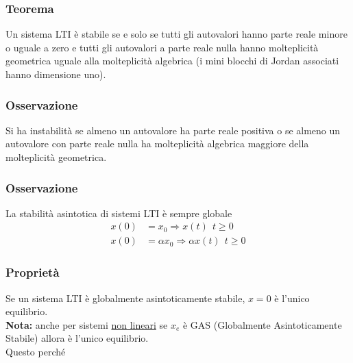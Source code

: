 \documentclass{article}
\numberwithin{equation}{subsection}
\begin{document}
\subsubsection*{Teorema}
Un sistema LTI è stabile se e solo se tutti gli autovalori hanno parte reale minore o uguale a zero e tutti gli autovalori a parte reale nulla hanno molteplicità geometrica uguale alla molteplicità algebrica (i mini blocchi di Jordan associati hanno dimensione uno).

\subsubsection*{Osservazione}
Si ha instabilità se almeno un autovalore ha parte reale positiva o se almeno un autovalore con parte reale nulla ha molteplicità algebrica maggiore della molteplicità geometrica.


\subsubsection*{Osservazione}
La stabilità asintotica di sistemi LTI è sempre globale
\begin{align*}
    x(0) &= x_0 \Longrightarrow x(t) \ \ t \geq 0 \\
    x(0) &= \alpha x_0 \Longrightarrow \alpha x(t) \ \ t \geq 0
\end{align*}


\subsubsection*{Proprietà}
Se un sistema LTI è globalmente asintoticamente stabile, $x=0$ è l'unico equilibrio.\\
\textbf{Nota:} anche per sistemi \underline{non lineari} se $x_e$ è GAS (Globalmente Asintoticamente Stabile) allora è l'unico equilibrio.
\vspace*{0.1cm}\\
Questo perché
\end{document}
